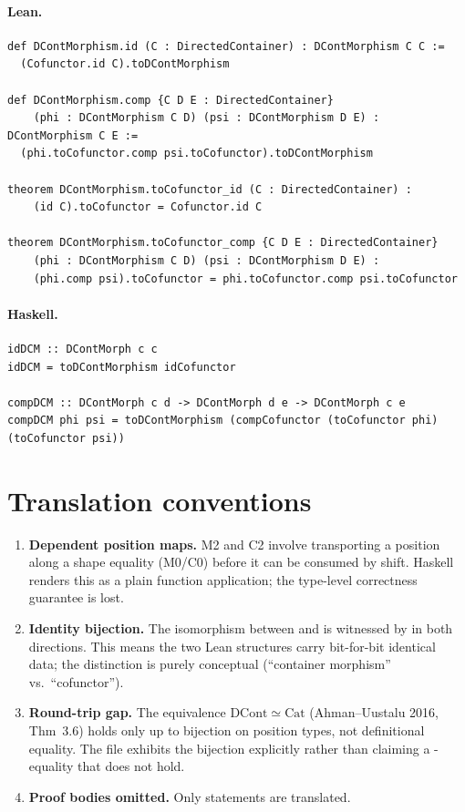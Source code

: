 \documentclass[11pt,a4paper]{article}
\begin{document}
\paragraph{Lean.}
\begin{lstlisting}[style=lean]
def DContMorphism.id (C : DirectedContainer) : DContMorphism C C :=
  (Cofunctor.id C).toDContMorphism

def DContMorphism.comp {C D E : DirectedContainer}
    (phi : DContMorphism C D) (psi : DContMorphism D E) : DContMorphism C E :=
  (phi.toCofunctor.comp psi.toCofunctor).toDContMorphism

theorem DContMorphism.toCofunctor_id (C : DirectedContainer) :
    (id C).toCofunctor = Cofunctor.id C

theorem DContMorphism.toCofunctor_comp {C D E : DirectedContainer}
    (phi : DContMorphism C D) (psi : DContMorphism D E) :
    (phi.comp psi).toCofunctor = phi.toCofunctor.comp psi.toCofunctor
\end{lstlisting}

\paragraph{Haskell.}
\begin{lstlisting}[style=haskell]
idDCM :: DContMorph c c
idDCM = toDContMorphism idCofunctor

compDCM :: DContMorph c d -> DContMorph d e -> DContMorph c e
compDCM phi psi = toDContMorphism (compCofunctor (toCofunctor phi) (toCofunctor psi))
\end{lstlisting}


\section{Translation conventions}

\begin{enumerate}
\item \textbf{Dependent position maps.}  M2 and C2 involve transporting a
  position along a shape equality (M0/C0) before it can be consumed by shift.
  Haskell renders this as a plain function application; the type-level
  correctness guarantee is lost.

\item \textbf{Identity bijection.}  The isomorphism between
   and  is witnessed by  in both
  directions.  This means the two Lean structures carry bit-for-bit identical
  data; the distinction is purely conceptual (``container morphism'' vs.\
  ``cofunctor'').

\item \textbf{Round-trip gap.}  The equivalence $\mathrm{DCont} \simeq \mathrm{Cat}$
  (Ahman--Uustalu 2016, Thm~3.6) holds only up to bijection on position types,
  not definitional equality.  The file exhibits the bijection explicitly rather
  than claiming a \lean{rfl}-equality that does not hold.

\item \textbf{Proof bodies omitted.}  Only statements are translated.
\end{enumerate}
\end{document}
